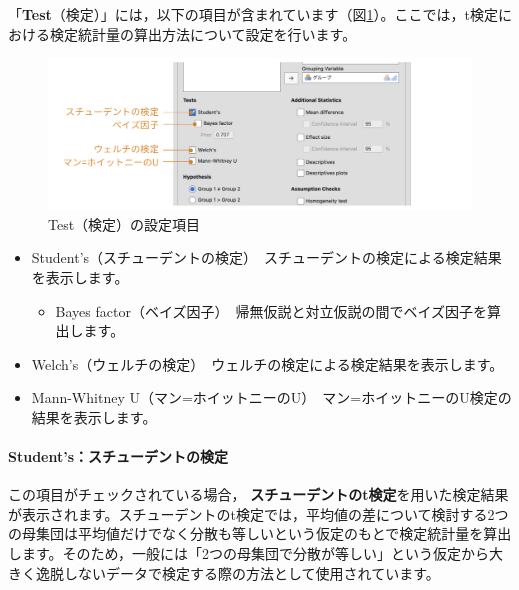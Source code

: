\documentclass[
  12pt,
  a5jpaper,
  lualatex, ja=standard]{bxjsbook}
\providecommand{\tightlist}{%
  \setlength{\itemsep}{0pt}\setlength{\parskip}{0pt}}
\renewcommand{\emph}[1]{\textbf{\color{emph} #1}}
\newenvironment{jmvsettings}{%
	\begin{center}%
	\begin{tcolorbox}[%
		title=設定項目,
		colframe=gmoji,
		colbacktitle=gmoji,
		colback=gmoji!2!white,
		breakable,
		width=.9\textwidth,
		]\small\addtolength{\leftmargini}{-3\labelsep}%
	}%
	{\end{tcolorbox}\end{center}}
\begin{document}
「\textbf{Test}（検定）」には，以下の項目が含まれています（図\ref{fig:ttests-tests}）。ここでは，t検定における検定統計量の算出方法について設定を行います。

\begin{figure}[!ht]

{\centering \includegraphics[width=1\linewidth]{images/ttests/tests} 

}

\caption{Test（検定）の設定項目}\label{fig:ttests-tests}
\end{figure}

\begin{jmvsettings}

\begin{itemize}
\tightlist
\item
  Student's（スチューデントの検定）　スチューデントの検定による検定結果を表示します。

  \begin{itemize}
  \tightlist
  \item
    Bayes factor（ベイズ因子）　帰無仮説と対立仮説の間でベイズ因子を算出します。
  \end{itemize}
\item
  Welch's（ウェルチの検定）　ウェルチの検定による検定結果を表示します。
\item
  Mann-Whitney U（マン=ホイットニーのU）　マン=ホイットニーのU検定の結果を表示します。
\end{itemize}

\end{jmvsettings}

\hypertarget{subsub:ttest-student}{%
\paragraph*{Student's：スチューデントの検定}\label{subsub:ttest-student}}

この項目がチェックされている場合，\emph{スチューデントのt検定}を用いた検定結果が表示されます。スチューデントのt検定では，平均値の差について検討する2つの母集団は平均値だけでなく分散も等しいという仮定のもとで検定統計量を算出します。そのため，一般には「2つの母集団で分散が等しい」という仮定から大きく逸脱しないデータで検定する際の方法として使用されています。
\end{document}
